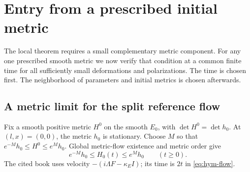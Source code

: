 \documentclass[11pt]{amsart}
\theoremstyle{definition}
\theoremstyle{remark}
\begin{document}
\section{Entry from a prescribed initial metric}\label{sec:entry}

The local theorem requires a small complementary metric component.
For any one prescribed smooth metric we now verify that condition
at a common finite time for all sufficiently small deformations
and polarizations. The time is chosen first. The neighborhood
of parameters and initial metrics is chosen afterwards.

\subsection{A metric limit for the split reference flow}
Fix a smooth positive metric $H^0$ on the smooth $E_0$, with
$\det H^0=\det h_0$. At $(l,x)=(0,0)$, the metric $h_0$
is stationary. Choose $M$ so that
$e^{-M}h_0\le H^0\le e^Mh_0$. Global metric-flow existence
\cite[Theorem 6.8.25]{Kobayashi87} and metric order give
\begin{equation}\label{eq:reference-order}
 e^{-M}h_0\le H_0(t)\le e^Mh_0\qquad(t\ge0).
\end{equation}
The cited book uses velocity $-(i\Lambda F-\kappa_E I)$;
its time is $2t$ in \eqref{eq:hym-flow}.
\end{document}
